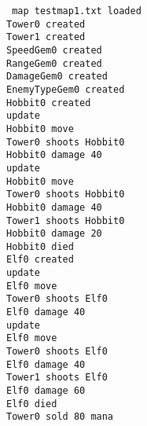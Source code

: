 \begin{itemize}
\texttt{
map testmap1.txt loaded \\
Tower0 created \\
Tower1 created  \\
SpeedGem0 created \\
RangeGem0 created \\
DamageGem0 created \\
EnemyTypeGem0 created \\
Hobbit0 created \\
update \\
Hobbit0 move \\
Tower0 shoots Hobbit0 \\
Hobbit0 damage 40 \\
update \\
Hobbit0 move  \\
Tower0 shoots Hobbit0 \\
Hobbit0 damage 40 \\
Tower1 shoots Hobbit0 \\
Hobbit0 damage 20 \\
Hobbit0 died \\
Elf0 created \\
update \\
Elf0 move \\
Tower0 shoots Elf0 \\
Elf0 damage 40 \\
update \\
Elf0 move  \\
Tower0 shoots Elf0 \\
Elf0 damage 40 \\
Tower1 shoots Elf0 \\
Elf0 damage 60 \\
Elf0 died \\
Tower0 sold 80 mana \\
}
\end{itemize}

